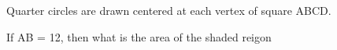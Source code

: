 \documentclass[preview]{standalone}
\begin{document}
\begin{center}
Quarter circles are drawn centered at each vertex of square ABCD.
        
 If AB = 12, then what is the area of the shaded reigon
\end{center}
\end{document}
